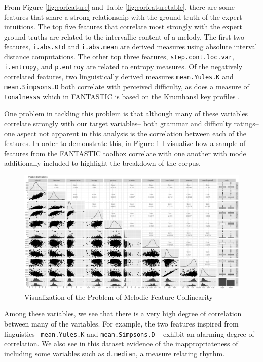 \documentclass[12pt,]{book}
\begin{document}
From Figure \ref{fig:corfeature} and Table \ref{fig:corfeaturetable}, there are some features that share a strong relationship with the ground truth of the expert intuitions.
The top five features that correlate most strongly with the expert ground truths are related to the intervallic content of a melody.
The first two features, \texttt{i.abs.std} and \texttt{i.abs.mean} are derived measures using absolute interval distance computations.
The other top three features, \texttt{step.cont.loc.var}, \texttt{i.entropy}, and \texttt{p.entroy} are related to entropy measures.
Of the negatively correlated features, two linguistically derived measures \texttt{mean.Yules.K} and \texttt{mean.Simpsons.D} both correlate with perceived difficulty, as does a measure of \texttt{tonalnesss} which in FANTASTIC is based on the Krumhansl key profiles \citep{krumhanslCognitiveFoundationsMusical2001}.

One problem in tackling this problem is that although many of these variables correlate strongly with our target variables-- both grammar and difficulty ratings-- one aspect not apparent in this analysis is the correlation between each of the features.
In order to demonstrate this, in Figure \ref{fig:featurecorrelations} I visualize how a sample of features from the FANTASTIC toolbox correlate with one another with mode additionally included to highlight the breakdown of the corpus.

\begin{figure}

{\centering \includegraphics[width=1\linewidth]{img/FANTASTIC_collin} 

}

\caption{Visualization of the Problem of Melodic Feature Collinearity}\label{fig:featurecorrelations}
\end{figure}

Among these variables, we see that there is a very high degree of correlation between many of the variables.
For example, the two features inspired from linguistics-- \texttt{mean.Yules.K} and \texttt{mean.Simpsons.D} -- exhibit an alarming degree of correlation.
We also see in this dataset evidence of the inappropriateness of including some variables such as \texttt{d.median}, a measure relating rhythm.
\end{document}
